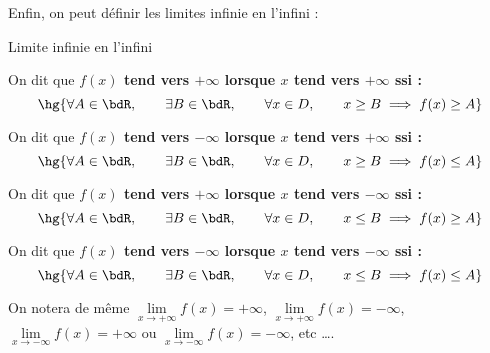 \documentclass[a4paper,french,bookmarks]{article}
\begin{document}
\begin{enumerate}
{        Enfin, on peut définir les limites infinie en l'infini :
        
        \begin{definition*}{Limite infinie en l'infini}{}
            \begin{enumerate}
                \itb On dit que \bf{$f(x)$ tend vers $+\infty$ lorsque $x$ tend vers $+\infty$} ssi :
                \[ \hg{\forall A \in \bdR,\qquad \exists B \in \bdR,\qquad \forall x \in D,\qquad x \geq B \implies f(x) \geq A} \]
                
                \itb On dit que \bf{$f(x)$ tend vers $-\infty$ lorsque $x$ tend vers $+\infty$} ssi :
                \[ \hg{\forall A \in \bdR,\qquad \exists B \in \bdR,\qquad \forall x \in D,\qquad x \geq B \implies f(x) \leq A} \]
                
                \itb On dit que \bf{$f(x)$ tend vers $+\infty$ lorsque $x$ tend vers $-\infty$} ssi :
                \[ \hg{\forall A \in \bdR,\qquad \exists B \in \bdR,\qquad \forall x \in D,\qquad x \leq B \implies f(x) \geq A} \]
                
                \itb On dit que \bf{$f(x)$ tend vers $-\infty$ lorsque $x$ tend vers $-\infty$} ssi :
                \[ \hg{\forall A \in \bdR,\qquad \exists B \in \bdR,\qquad \forall x \in D,\qquad x \leq B \implies f(x) \leq A} \]
            \end{enumerate}
        \end{definition*}
        
        On notera de même $\lim\limits_{x \to +\infty} f(x) = +\infty$, $\lim\limits_{x \to +\infty} f(x) = -\infty$, $\lim\limits_{x \to -\infty} f(x) = +\infty$ ou $\lim\limits_{x \to -\infty} f(x) = -\infty$, etc \dots.
        
}
\end{enumerate}
\end{document}
